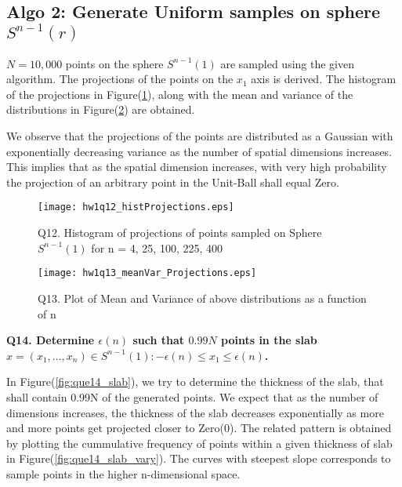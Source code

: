 \documentclass[11pt]{article}
\begin{document}
\hrulefill \vspace{2 pt}
\subsection{Algo 2: Generate Uniform samples on sphere $S^{n-1}(r)$}

$N = 10,000$ points on the sphere $S^{n-1}(1)$ are sampled using the given algorithm. 
The projections of the points on the $x_1$ axis is derived. The histogram of the projections in Figure(\ref{fig:que12}), along with the mean and variance of the distributions in Figure(\ref{fig:que13}) are obtained.

We observe that the projections of the points are distributed as a Gaussian with exponentially decreasing variance as the number of spatial dimensions increases. 
This implies that as the spatial dimension increases, with very high probability the projection of an arbitrary point in the Unit-Ball shall equal Zero. 


\begin{figure}[h!]
\centering
\texttt{[image: hw1q12\_histProjections.eps]}\\
\caption{Q12. Histogram of projections of points sampled on Sphere $S^{n-1}(1)$ for n = {4, 25, 100, 225, 400}}
\label{fig:que12}
\end{figure}

 \begin{figure}[h!]
\centering
\texttt{[image: hw1q13\_meanVar\_Projections.eps]}\\
\caption{Q13. Plot of Mean and Variance of above distributions as a function of n}
\label{fig:que13}
\end{figure}




\textbf{Q14. Determine $\epsilon(n)$ such that $0.99N$ points in the slab $ {x = (x_1, ..., x_n ) \in S^{n-1}(1): -\epsilon(n) \leq x_1 \leq \epsilon(n)}$.}

In Figure(\ref{fig:que14_slab}), we try to determine the thickness of the slab, that shall contain 0.99N of the generated points. We expect that as the number of dimensions increases, the thickness of the slab decreases exponentially as more and more points get projected closer to Zero($0$). The related pattern is obtained by plotting the cummulative frequency of points within a given thickness of slab in Figure(\ref{fig:que14_slab_vary}). The curves with steepest slope corresponds to sample points in the higher n-dimensional space.
\end{document}
